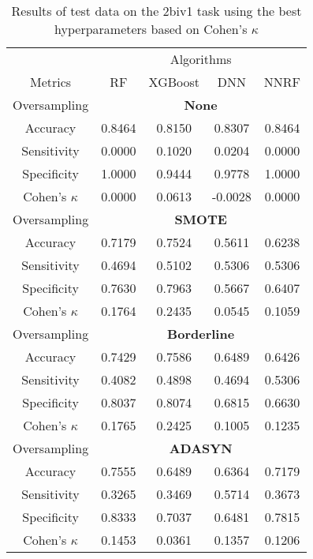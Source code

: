 \begin{table}[!htb]
\centering
\caption{Results of test data on the 2biv1 task using the best hyperparameters based on Cohen's $\kappa$}
\label{tab:2biv1_test_results}
\begin{tabular}{c | c c c c}
\hline
 & \multicolumn{4}{c}{Algorithms}\\ 
Metrics &RF & XGBoost & DNN & NNRF\\ 
\hline
Oversampling &\multicolumn{4}{|c}{\textbf{None}}\\ 
\hline
Accuracy & 0.8464 & 0.8150 & 0.8307 & 0.8464\\ 
Sensitivity & 0.0000 & 0.1020 & 0.0204 & 0.0000\\ 
Specificity & 1.0000 & 0.9444 & 0.9778 & 1.0000\\ 
Cohen's $\kappa$ & 0.0000 & 0.0613 & -0.0028 & 0.0000\\ 
\hline
Oversampling &\multicolumn{4}{|c}{\textbf{SMOTE}}\\ 
\hline
Accuracy & 0.7179 & 0.7524 & 0.5611 & 0.6238\\ 
Sensitivity & 0.4694 & 0.5102 & 0.5306 & 0.5306\\ 
Specificity & 0.7630 & 0.7963 & 0.5667 & 0.6407\\ 
Cohen's $\kappa$ & 0.1764 & 0.2435 & 0.0545 & 0.1059\\ 
\hline
Oversampling &\multicolumn{4}{|c}{\textbf{Borderline}}\\ 
\hline
Accuracy & 0.7429 & 0.7586 & 0.6489 & 0.6426\\ 
Sensitivity & 0.4082 & 0.4898 & 0.4694 & 0.5306\\ 
Specificity & 0.8037 & 0.8074 & 0.6815 & 0.6630\\ 
Cohen's $\kappa$ & 0.1765 & 0.2425 & 0.1005 & 0.1235\\ 
\hline
Oversampling &\multicolumn{4}{|c}{\textbf{ADASYN}}\\ 
\hline
Accuracy & 0.7555 & 0.6489 & 0.6364 & 0.7179\\ 
Sensitivity & 0.3265 & 0.3469 & 0.5714 & 0.3673\\ 
Specificity & 0.8333 & 0.7037 & 0.6481 & 0.7815\\ 
Cohen's $\kappa$ & 0.1453 & 0.0361 & 0.1357 & 0.1206\\ 
\hline
\end{tabular}
\end{table}


